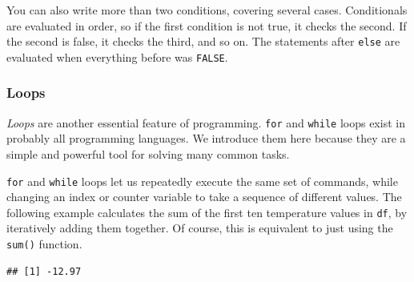 \documentclass[
]{book}
\newenvironment{Shaded}{\begin{snugshade}}{\end{snugshade}}
\newcommand{\CommentTok}[1]{\textcolor[rgb]{0.56,0.35,0.01}{\textit{#1}}}
\newcommand{\ControlFlowTok}[1]{\textcolor[rgb]{0.13,0.29,0.53}{\textbf{#1}}}
\newcommand{\DecValTok}[1]{\textcolor[rgb]{0.00,0.00,0.81}{#1}}
\newcommand{\FunctionTok}[1]{\textcolor[rgb]{0.00,0.00,0.00}{#1}}
\newcommand{\NormalTok}[1]{#1}
\newcommand{\OtherTok}[1]{\textcolor[rgb]{0.56,0.35,0.01}{#1}}
\newcommand{\SpecialCharTok}[1]{\textcolor[rgb]{0.00,0.00,0.00}{#1}}
\begin{document}
You can also write more than two conditions, covering several cases. Conditionals are evaluated in order, so if the first condition is not true, it checks the second. If the second is false, it checks the third, and so on. The statements after \texttt{else} are evaluated when everything before was \texttt{FALSE}.

\hypertarget{loops}{%
\subsubsection{Loops}\label{loops}}

\emph{Loops} are another essential feature of programming. \texttt{for} and \texttt{while} loops exist in probably all programming languages. We introduce them here because they are a simple and powerful tool for solving many common tasks.

\texttt{for} and \texttt{while} loops let us repeatedly execute the same set of commands, while changing an index or counter variable to take a sequence of different values. The following example calculates the sum of the first ten temperature values in \texttt{df}, by iteratively adding them together. Of course, this is equivalent to just using the \texttt{sum()} function.

\begin{Shaded}
\end{Shaded}

\begin{verbatim}
## [1] -12.97
\end{verbatim}

\begin{Shaded}
\end{Shaded}
\end{document}
